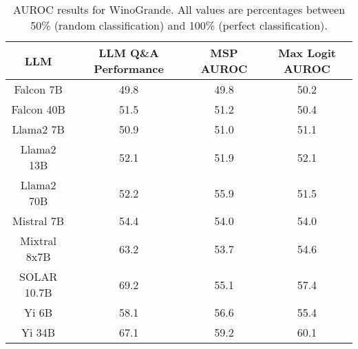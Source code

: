 \renewcommand\arraystretch{1.2}
\begin{table*}
\centering
\begin{tabular}{c|c|c|c}
LLM & LLM Q\&A Performance & MSP AUROC & Max Logit AUROC\\ \hline
Falcon 7B & 49.8 & 49.8 & 50.2\\
Falcon 40B & 51.5 & 51.2 & 50.4\\
Llama2 7B & 50.9 & 51.0 & 51.1\\
Llama2 13B & 52.1 & 51.9 & 52.1\\
Llama2 70B & 52.2 & 55.9 & 51.5\\
Mistral 7B & 54.4 & 54.0 & 54.0\\
Mixtral 8x7B & 63.2 & 53.7 & 54.6\\
SOLAR 10.7B & 69.2 & 55.1 & 57.4\\
Yi 6B & 58.1 & 56.6 & 55.4\\
Yi 34B & 67.1 & 59.2 & 60.1\\
\hline
\end{tabular}
\caption{AUROC results for WinoGrande. All values are percentages between 50\% (random classification) and 100\% (perfect classification).}
\label{tab:winogrande_auroc}
\end{table*}
